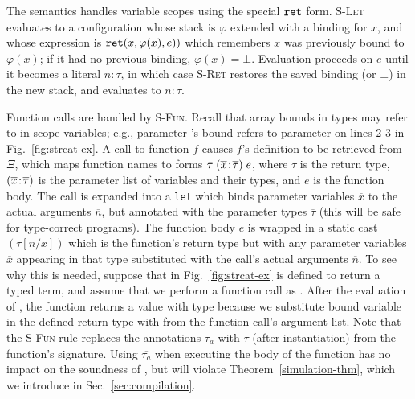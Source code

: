 %
The semantics handles variable scopes using the special $\mathtt{ret}$
form. \textsc{S-Let} evaluates to a configuration whose stack
is $\varphi$ extended with a binding for $x$, and whose expression is
$\mathtt{ret}({x},{\varphi(x)},{e}))$ which remembers $x$ was previously bound to
$\varphi(x)$; if it had no previous binding, $\varphi(x) =
\bot$. Evaluation proceeds on $e$ until it becomes a literal
$n\!:\!\tau$, in which case \textsc{S-Ret} restores the saved
binding (or $\bot$) in the new stack, and evaluates to
$n\!:\!\tau$. 

Function calls are handled by \textsc{S-Fun}. Recall that array
bounds in types may refer to in-scope variables; e.g., parameter
's bound  refers to parameter  on lines
2-3 in Fig.~\ref{fig:strcat-ex}. A call to function $f$ causes $f$'s
definition to be retrieved from $\Xi$,
which maps function names to
forms $\tau\;({\overline{x}}\!:\!{\overline{\tau}})\;e$, where
$\tau$ is the return type, $({\overline{x}}\!:\!{\overline{\tau}})$
is the parameter list of variables and their types, and $e$ is the
function body. The call is expanded into a \texttt{let} which binds
parameter variables $\overline{x}$ to the actual arguments
$\overline{n}$, but annotated with the parameter types
$\overline{\tau}$ (this will be safe for type-correct programs). The
function body $e$ is wrapped in a static cast
$(\tau[\overline{n} / \overline{x}])$ which is the function's return
type but with any parameter variables $\overline{x}$ appearing in that
type substituted with the call's actual arguments $\overline{n}$. To
see why this is needed, suppose that  in
Fig.~\ref{fig:strcat-ex} is defined to return a
 typed term, and assume that we
perform a  function call as
. After the evaluation of , the
function returns a value with type 
because we substitute bound variable  in the 
defined return type with  from the function call's
argument list.
Note that the \textsc{S-Fun} rule replaces the
  annotations $\overline{\tau_a}$ with
  $\overline{\tau}$ (after instantiation) from the function's
  signature. Using $\overline{\tau_a}$ when executing the body of
the function has no impact on the soundness of \lang, but will violate
Theorem~\ref{simulation-thm}, which we introduce in Sec.~\ref{sec:compilation}.

